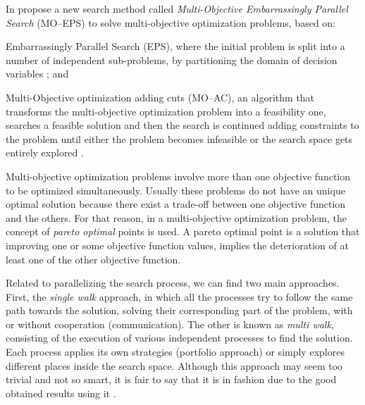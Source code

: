 In \cite{Yasuhara2015}  propose a new search method called \textit{Multi-Objective Embarrassingly Parallel Search} (MO--EPS) to solve multi-objective optimization problems, based on: 
\begin{inparaenum}[i)]
	\item Embarrassingly Parallel Search (EPS), where the initial problem is split into a number of independent sub-problems, by partitioning the domain of decision variables \cite{Rezgui2013, Regin2014}; and
	\item Multi-Objective optimization adding cuts (MO--AC), an algorithm that transforms the multi-objective optimization problem into a feasibility one, searches a feasible solution and then the search is continued adding constraints to the problem until either the problem becomes infeasible or the search space gets entirely explored \cite{Kotecha2010}.
\end{inparaenum}
Multi-objective optimization problems involve more than one objective function to be optimized simultaneously. Usually these problems do not have an unique optimal solution because there exist a trade-off between one objective function and the others. For that reason, in a multi-objective optimization problem, the concept of \textit{pareto optimal} points is used. A pareto optimal point is a solution that improving one or some objective function values, implies the deterioration of at least one of the other objective function. %

Related to parallelizing the search process, we can find two main approaches. First, the {\it single walk} approach, in which all the processes try to follow the same path towards the solution, solving their corresponding part of the problem, with or without cooperation (communication). The other is known as {\it multi walk}, consisting of the execution of various independent processes to find the solution. Each process applies its own strategies (portfolio approach) or simply explores different places inside the search space. Although this approach may seem too trivial and not so smart, it is fair to say that it is in fashion due to the good obtained results using it \cite{Diaz}.

